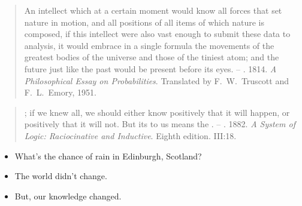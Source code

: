\documentclass[9pt]{report}
\begin{document}
{\linespread{1.3}
\small\linespread{1.35}
\begin{quote}\linespread{1.5}An intellect which at a certain
  moment would know all forces that set nature in motion, and all
  positions of all items of which nature is composed, if this
  intellect were also vast enough to submit these data to analysis, it
  would embrace in a single formula the movements of the greatest
  bodies of the universe and those of the tiniest atom;  and the future just like the
  past would be present before its eyes.
  \vfill\linespread{1.25}
  -- \footnotesize {}. 1814.  \textit{A
    Philosophical Essay on Probabilities}.  Translated by
  F.~W.~Truscott and F.~L.~Emory, 1951.  
\end{quote}
}


{\linespread{1.3}
\small
\begin{quote}
; if we knew all, we should either know
positively that it will happen, or positively that it will not. But
its  to us means the .
\vfill\linespread{1.25}
-- \footnotesize {}.  1882.  \textit{A System
  of Logic: Raciocinative and Inductive}. Eighth edition.  III:18.
\end{quote}
}

\begin{itemize}
\item What's the chance of rain in Edinburgh, Scotland?
\item The world didn't change.
\item But, our knowledge changed.
\end{itemize}
\end{document}
